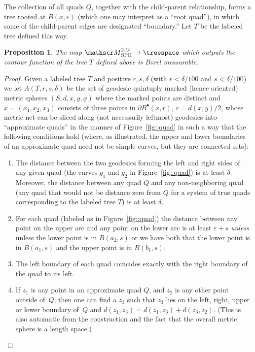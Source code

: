 \documentclass[JEP,XML,SOM,Unicode]{cedram}
\let\mathcal\mathscr
\newcommand{\sbullet}{{\scriptscriptstyle\bullet}}
\let\epsilon\varepsilon
\theoremstyle{plain}
\numberwithin{theorem}{section}
\newtheorem{proposition}[theorem]{Proposition}
\theoremstyle{definition}
\newcommand\gmsspace{{\mathcal M}_{\mathrm{SPH}}}
\let\ul\underline
\newcommand{\fb}[2]{B^\sbullet(#1,#2)}
\begin{document}
The collection of all quads $Q$, together with the child-parent relationship, forms a tree rooted at $B(x, \epsilon)$ (which one may interpret as a ``root quad''), in which some of the child-parent edges are designated ``boundary.'' Let $T$ be the labeled tree defined this way.

\begin{proposition}
\label{prop::treemeasurable}
The map $\gmsspace^{2,O} \to \treespace$ which outputs the contour function of the tree $T$ defined above is Borel measurable.
\end{proposition}
\begin{proof}
Given a labeled tree $T$ and positive $r,s,\delta$ (with $r<\delta/100$ and $s<\delta/100$) we let $A(T,r,s,\delta)$ be the set of geodesic quintuply marked (hence oriented) metric spheres $(S,d,x,y,\ul{x})$ where the marked points are distinct and $\ul{x} = (x_1,x_2,x_3)$ consists of three points in $\partial \fb{x}{r}$, $r = d(x,y)/2$, whose metric net can be sliced along (not necessarily leftmost) geodesics into ``approximate quads'' in the manner of Figure~\ref{fig::quad} in such a way that the following conditions hold (where, as illustrated, the upper and lower boundaries of an approximate quad need not be simple curves, but they are connected sets):
\begin{enumerate}
\item The distance between the two geodesics forming the left and right sides of any given quad (the curves $g_1$ and $g_2$ in Figure~\ref{fig::quad}) is at least $\delta$. Moreover, the distance between any quad $Q$ and any non-neighboring quad (\ie any quad that would not be distance zero from $Q$ for a system of true quads corresponding to the labeled tree $T$) is at least $\delta$.
\item For each quad (labeled as in Figure~\ref{fig::quad}) the distance between any point on the upper arc and any point on the lower arc is at least $\epsilon +s$ \emph{unless} unless the lower point is in $B(a_2, s)$ or we have both that the lower point is in $B(a_1,s)$ and the upper point is in $B(b_1,s)$.
\item The left boundary of each quad coincides exactly with the right boundary of the quad to its left.
\item If $z_1$ is any point in an approximate quad $Q$, and $z_2$ is any other point outside of~$Q$, then one can find a $z_3$ such that $z_3$ lies on the left, right, upper or lower boundary of~$Q$ and $d(z_1, z_3) = d(z_1,z_3)+d(z_3,z_2)$. (This is also automatic from the construction and the fact that the overall metric sphere is a length space.)
\end{enumerate}


\end{proof}
\end{document}
